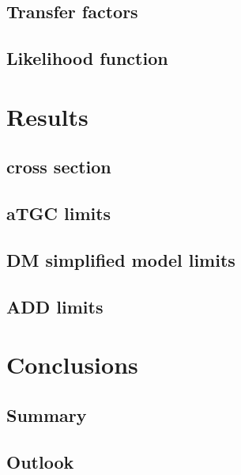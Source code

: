 \documentclass[oneside, letterpaper, 12pt, oldfontcommands]{memoir}
\begin{document}
\section{Transfer factors} \label{sec:background_estimation_transfer_factors}
\section{Likelihood function} \label{sec:background_estimation_likelihood}

\chapter{Results} \label{chap:results}
\section{\texorpdfstring{\zinvg}{Z(νν)γ} cross section} \label{sec:results_znng_xsec}
\section{aTGC limits} \label{sec:results_aTGC}
\section{DM simplified model limits} \label{sec:results_DM}
\section{ADD limits} \label{sec:results_ADD}

\chapter{Conclusions} \label{chap:conclusions}
\section{Summary} \label{sec:conclusions_summary}
\section{Outlook} \label{sec:conclusions_outlook}



\end{document}
